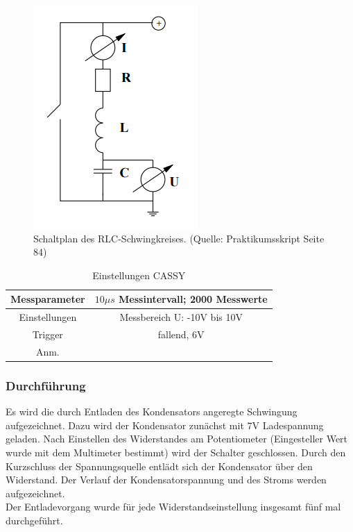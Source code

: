 \documentclass[12pt,a4paper]{article}
\begin{document}
\begin{figure}
\begin{center}
\includegraphics[scale=0.8]{Bilder/RLCSchaltung.png}
\end{center}
\caption[RLC Schaltung]{Schaltplan des RLC-Schwingkreises. (Quelle: Praktikumsskript Seite 84)}
\label{fig:RLCSchaltung}
\end{figure}

\begin{table}
\begin{center}
\begin{tabular}{|c|c|}
\hline
Messparameter &  $10 \mu s$ Messintervall;  2000 Messwerte \\
\hline
Einstellungen & Messbereich U: -10V bis 10V\\
\hline
Trigger & fallend, 6V\\
\hline
Anm. & \\
\hline
\end{tabular}
\caption[CASSY]{Einstellungen CASSY}
\label{tab:CASSY}
\end{center}
\end{table}


\subsubsection{Durchführung}
Es wird die durch Entladen des Kondensators angeregte Schwingung aufgezeichnet. Dazu wird der Kondensator zunächst mit 7V Ladespannung geladen. Nach Einstellen des Widerstandes am Potentiometer (Eingesteller Wert wurde mit dem Multimeter bestimmt) wird der Schalter geschlossen. Durch den Kurzschluss der Spannungsquelle entlädt sich der Kondensator über den Widerstand. Der Verlauf der Kondensatorspannung und des Stroms werden aufgezeichnet.\\
Der Entladevorgang wurde für jede Widerstandseinstellung insgesamt fünf mal durchgeführt.
\end{document}
